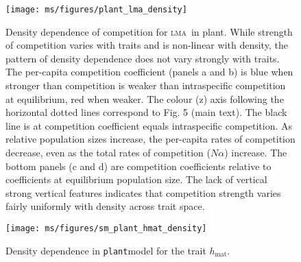 \documentclass[10pt,twoside]{article}
\newcommand{\plant}{{\tt plant}}
\newcommand{\hmat}{\ensuremath{h_{\text{mat}}}}
\newcommand{\lma}{{\textsc{lma}}}
\newcommand{\todo}[1]{{\color{navy}{(todo: #1)}}}
\begin{document}
\newpage


\begin{figure}[ht]
  \centering
  \texttt{[image: ms/figures/plant\_lma\_density]}
  \caption{Density dependence of competition for \lma\ in plant.  While strength of competition varies with traits and is non-linear with density, the pattern of density dependence does not vary strongly with traits.  The per-capita competition coefficient (panels a and b) is blue when stronger than competition is weaker than intraspecific competition at equilibrium, red when weaker.  The colour (z) axis following the horizontal dotted lines correspond to Fig. 5 (main text).  The black line is at competition coefficient equals intraspecific competition. As relative population sizes increase, the per-capita rates of competition decrease, even as the total rates of competition ($N \alpha$) increase.  The bottom panels (c and d) are competition coefficients relative to coefficients at equilibrium population size.  The lack of vertical strong vertical features indicates that competition strength varies fairly uniformly with density across trait space.
  } 
  \label{fig:plant_lma_density_dependence}
\end{figure}


\newpage

\begin{figure}[ht]
  \centering
  \texttt{[image: ms/figures/sm\_plant\_hmat\_density]}
  \caption{Density dependence in \plant model for the trait \hmat. 
  \todo{MORE details needed here. See explanation for lma}
  }
  \label{fig:plant_hmat_density_dependence}
\end{figure}

\newpage
\end{document}
